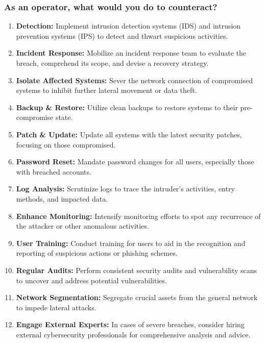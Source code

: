 \subsubsection{As an operator, what would you do to counteract?}
\begin{enumerate}
    \item \textbf{Detection:}
          Implement intrusion detection systems (IDS) and intrusion prevention systems (IPS) to detect and thwart suspicious activities.

    \item \textbf{Incident Response:}
          Mobilize an incident response team to evaluate the breach, comprehend its scope, and devise a recovery strategy.

    \item \textbf{Isolate Affected Systems:}
          Sever the network connection of compromised systems to inhibit further lateral movement or data theft.

    \item \textbf{Backup \& Restore:}
          Utilize clean backups to restore systems to their pre-compromise state.

    \item \textbf{Patch \& Update:}
          Update all systems with the latest security patches, focusing on those compromised.

    \item \textbf{Password Reset:}
          Mandate password changes for all users, especially those with breached accounts.

    \item \textbf{Log Analysis:}
          Scrutinize logs to trace the intruder's activities, entry methods, and impacted data.

    \item \textbf{Enhance Monitoring:}
          Intensify monitoring efforts to spot any recurrence of the attacker or other anomalous activities.

    \item \textbf{User Training:}
          Conduct training for users to aid in the recognition and reporting of suspicious actions or phishing schemes.

    \item \textbf{Regular Audits:}
          Perform consistent security audits and vulnerability scans to uncover and address potential vulnerabilities.

    \item \textbf{Network Segmentation:}
          Segregate crucial assets from the general network to impede lateral attacks.

    \item \textbf{Engage External Experts:}
          In cases of severe breaches, consider hiring external cybersecurity professionals for comprehensive analysis and advice.
\end{enumerate}



